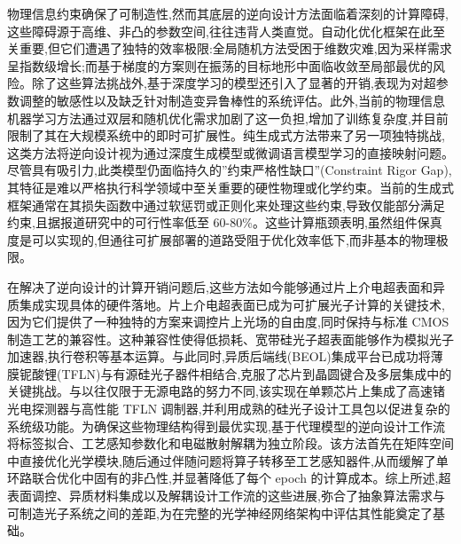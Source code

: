 物理信息约束确保了可制造性,然而其底层的逆向设计方法面临着深刻的计算障碍,这些障碍源于高维、非凸的参数空间,往往违背人类直觉。自动化优化框架在此至关重要,但它们遭遇了独特的效率极限:全局随机方法受困于维数灾难,因为采样需求呈指数级增长;而基于梯度的方案则在振荡的目标地形中面临收敛至局部最优的风险。除了这些算法挑战外,基于深度学习的模型还引入了显著的开销,表现为对超参数调整的敏感性以及缺乏针对制造变异鲁棒性的系统评估。此外,当前的物理信息机器学习方法通过双层和随机优化需求加剧了这一负担,增加了训练复杂度,并目前限制了其在大规模系统中的即时可扩展性。纯生成式方法带来了另一项独特挑战,这类方法将逆向设计视为通过深度生成模型或微调语言模型学习的直接映射问题。尽管具有吸引力,此类模型仍面临持久的''约束严格性缺口''(Constraint Rigor Gap),其特征是难以严格执行科学领域中至关重要的硬性物理或化学约束。当前的生成式框架通常在其损失函数中通过软惩罚或正则化来处理这些约束,导致仅能部分满足约束,且据报道研究中的可行性率低至 60-80\%。这些计算瓶颈表明,虽然组件保真度是可以实现的,但通往可扩展部署的道路受阻于优化效率低下,而非基本的物理极限。\citep{doi_10_48550_arxiv_2602_18148_e9c0a72b} \citep{doi_10_29026_oes_2022_210012_27973a69} \citep{doi_10_55041_ijsrem43509_b9a7bd5e} \citep{doi_10_48550_arxiv_2511_00070_bf8eda11}

在解决了逆向设计的计算开销问题后,这些方法如今能够通过片上介电超表面和异质集成实现具体的硬件落地。片上介电超表面已成为可扩展光子计算的关键技术,因为它们提供了一种独特的方案来调控片上光场的自由度,同时保持与标准 CMOS 制造工艺的兼容性。这种兼容性使得低损耗、宽带硅光子超表面能够作为模拟光子加速器,执行卷积等基本运算。与此同时,异质后端线(BEOL)集成平台已成功将薄膜铌酸锂(TFLN)与有源硅光子器件相结合,克服了芯片到晶圆键合及多层集成中的关键挑战。与以往仅限于无源电路的努力不同,该实现在单颗芯片上集成了高速锗光电探测器与高性能 TFLN 调制器,并利用成熟的硅光子设计工具包以促进复杂的系统级功能。为确保这些物理结构得到最优实现,基于代理模型的逆向设计工作流将标签拟合、工艺感知参数化和电磁散射解耦为独立阶段。该方法首先在矩阵空间中直接优化光学模块,随后通过伴随问题将算子转移至工艺感知器件,从而缓解了单环路联合优化中固有的非凸性,并显著降低了每个 epoch 的计算成本。综上所述,超表面调控、异质材料集成以及解耦设计工作流的这些进展,弥合了抽象算法需求与可制造光子系统之间的差距,为在完整的光学神经网络架构中评估其性能奠定了基础。\citep{doi_10_1515_nanoph_2022_0294_1bd118d5} \citep{s2_9b444e84d20ae6e3d62d2d4df30268b5a53baad2_40af2cc9} \citep{s2_753a5d83a96e0194da93bcb6f20fa0bd356e37fa_c11e3796}

